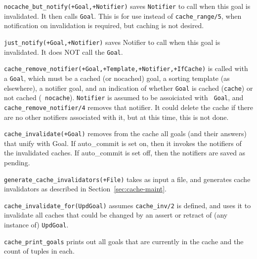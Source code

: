 \begin{description}

{\tt nocache\_but\_notify(+Goal,+Notifier)} saves {\tt Notifier} to call when
this goal is invalidated.  It then calls {\tt Goal}.  This is for use
instead of {\tt cache\_range/5}, when notification on invalidation is
required, but caching is not desired.

{\tt just\_notify(+Goal,+Notifier)} saves Notifier to call when this
goal is invalidated.  It does NOT call the {\tt Goal}.


{\tt cache\_remove\_notifier(+Goal,+Template,+Notifier,+IfCache)} is
called with a {\tt Goal}, which must be a cached (or nocached) goal, a
sorting template (as elsewhere), a notifier goal, and an indication of
whether {\tt Goal} is cached ({\tt cache}) or not cached ({\tt
nocache}). {\tt Notifier} is assumed to be assoiciated with {\tt
Goal}, and {\tt cache\_remove\_notifier/4} removes that notifier.  It
could delete the cache if there are no other notifiers associated with
it, but at this time, this is not done.

 {\tt cache\_invalidate(+Goal)} removes from the cache all goals (and
 their answers) that unify with Goal. If auto\_commit is set on, then
 it invokes the notifiers of the invalidated caches.  If auto\_commit
 is set off, then the notifiers are saved as pending.

{\tt generate\_cache\_invalidators(+File)} takes as input a file, and
generates cache invalidators as described in
Section~\ref{sec:cache-maint}.

{\tt cache\_invalidate\_for(UpdGoal)} assumes {\tt cache\_inv/2} is
defined, and uses it to invalidate all caches that could be changed by
an assert or retract of (any instance of) {\tt UpdGoal}.

{\tt cache\_print\_goals} prints out all goals that are currently in the
cache and the count of tuples in each.


\end{description}
